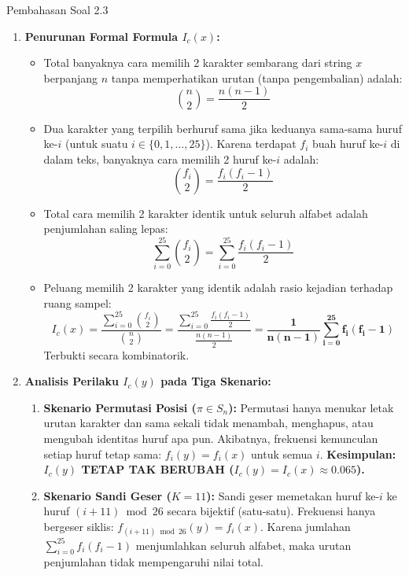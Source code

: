 \documentclass[11pt,a4paper]{article}
\begin{document}
\begin{solusibox}{Pembahasan Soal 2.3}
\begin{enumerate}[leftmargin=*]
    \item \textbf{Penurunan Formal Formula $I_c(x)$:}
    \begin{itemize}
        \item Total banyaknya cara memilih 2 karakter sembarang dari string $x$ berpanjang $n$ tanpa memperhatikan urutan (tanpa pengembalian) adalah:
        \[
        \binom{n}{2} = \frac{n(n - 1)}{2}
        \]
        \item Dua karakter yang terpilih berhuruf sama jika keduanya sama-sama huruf ke-$i$ (untuk suatu $i \in \{0, 1, \dots, 25\}$). Karena terdapat $f_i$ buah huruf ke-$i$ di dalam teks, banyaknya cara memilih 2 huruf ke-$i$ adalah:
        \[
        \binom{f_i}{2} = \frac{f_i(f_i - 1)}{2}
        \]
        \item Total cara memilih 2 karakter identik untuk seluruh alfabet adalah penjumlahan saling lepas:
        \[
        \sum_{i=0}^{25} \binom{f_i}{2} = \sum_{i=0}^{25} \frac{f_i(f_i - 1)}{2}
        \]
        \item Peluang memilih 2 karakter yang identik adalah rasio kejadian terhadap ruang sampel:
        \[
        I_c(x) = \frac{\sum_{i=0}^{25} \binom{f_i}{2}}{\binom{n}{2}} = \frac{\sum_{i=0}^{25} \frac{f_i(f_i - 1)}{2}}{\frac{n(n - 1)}{2}} = \mathbf{\frac{1}{n(n - 1)} \sum_{i=0}^{25} f_i (f_i - 1)}
        \]
        Terbukti secara kombinatorik.
    \end{itemize}
    \item \textbf{Analisis Perilaku $I_c(y)$ pada Tiga Skenario:}
    \begin{enumerate}[label=(\roman*)]
        \item \textbf{Skenario Permutasi Posisi ($\pi \in S_n$):}
        Permutasi hanya menukar letak urutan karakter dan sama sekali tidak menambah, menghapus, atau mengubah identitas huruf apa pun. Akibatnya, frekuensi kemunculan setiap huruf tetap sama: $f_i(y) = f_i(x)$ untuk semua $i$.
        \textbf{Kesimpulan: $I_c(y)$ TETAP TAK BERUBAH ($I_c(y) = I_c(x) \approx 0.065$).}
        \item \textbf{Skenario Sandi Geser ($K = 11$):}
        Sandi geser memetakan huruf ke-$i$ ke huruf $(i + 11) \bmod 26$ secara bijektif (satu-satu). Frekuensi hanya bergeser siklis: $f_{(i+11)\bmod 26}(y) = f_i(x)$.
        Karena jumlahan $\sum_{i=0}^{25} f_i(f_i - 1)$ menjumlahkan seluruh alfabet, maka urutan penjumlahan tidak mempengaruhi nilai total.

\end{enumerate}
\end{enumerate}
\end{solusibox}
\end{document}

